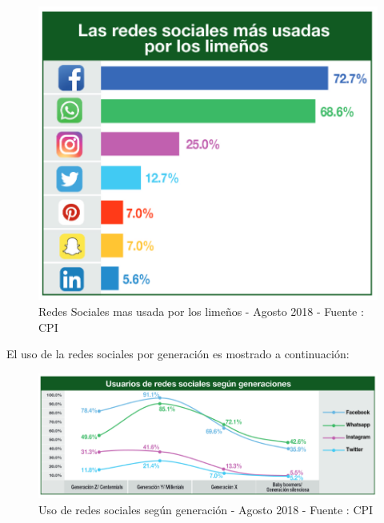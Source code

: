 \begin{figure}[H]
\centering
\includegraphics[scale=0.7]{chapters/img/Ch01_UsoRedesSocialesLima.PNG}
\caption{Redes Sociales mas usada por los lime\~nos - Agosto 2018 - Fuente : CPI}
\label{cpi_2018}
\end{figure}


El uso de la redes sociales por generaci\'on es mostrado a continuaci\'on:

\begin{figure}[H]
\centering
\includegraphics[scale=0.5]{chapters/img/Ch01_UsoRedesSocialesGeneracion.PNG}
\caption{Uso de redes sociales seg\'un generaci\'on - Agosto 2018 - Fuente : CPI}
\end{figure}



\cleardoublepage